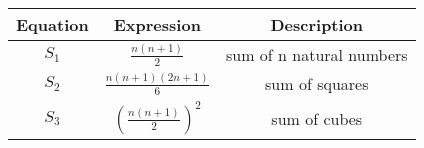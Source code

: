 \begin{tabular}{|c|c|c|}
    \hline
    \textbf{Equation} & \textbf{Expression} & \textbf{Description} \\
    \hline
    \(S_1\) & $\frac{n(n+1)}{2}$ & sum of n natural numbers\\
    \hline
    \(S_2\) & $\frac{n(n+1)(2n+1)}{6}$ & sum of squares\\
    \hline
    \(S_3\) & $\left(\frac{n(n+1)}{2}\right)^2$ & sum of cubes \\
    \hline
 \end{tabular}

